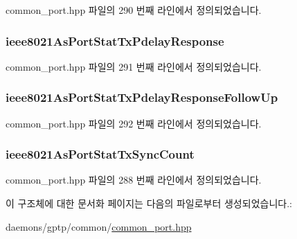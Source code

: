 common\+\_\+port.\+hpp 파일의 290 번째 라인에서 정의되었습니다.

\subsubsection[{\texorpdfstring{ieee8021\+As\+Port\+Stat\+Tx\+Pdelay\+Response}{ieee8021AsPortStatTxPdelayResponse}}]{ ieee8021\+As\+Port\+Stat\+Tx\+Pdelay\+Response}\hypertarget{struct_port_counters__t_a699064a3507a0d009de15645ca876d23}{}\label{struct_port_counters__t_a699064a3507a0d009de15645ca876d23}


common\+\_\+port.\+hpp 파일의 291 번째 라인에서 정의되었습니다.

\subsubsection[{\texorpdfstring{ieee8021\+As\+Port\+Stat\+Tx\+Pdelay\+Response\+Follow\+Up}{ieee8021AsPortStatTxPdelayResponseFollowUp}}]{ ieee8021\+As\+Port\+Stat\+Tx\+Pdelay\+Response\+Follow\+Up}\hypertarget{struct_port_counters__t_a6301a36e0490db4e2d6d7a6953c7c9f7}{}\label{struct_port_counters__t_a6301a36e0490db4e2d6d7a6953c7c9f7}


common\+\_\+port.\+hpp 파일의 292 번째 라인에서 정의되었습니다.

\subsubsection[{\texorpdfstring{ieee8021\+As\+Port\+Stat\+Tx\+Sync\+Count}{ieee8021AsPortStatTxSyncCount}}]{ ieee8021\+As\+Port\+Stat\+Tx\+Sync\+Count}\hypertarget{struct_port_counters__t_abaebe28dd0ed5e666715ddf3eb82058c}{}\label{struct_port_counters__t_abaebe28dd0ed5e666715ddf3eb82058c}


common\+\_\+port.\+hpp 파일의 288 번째 라인에서 정의되었습니다.



이 구조체에 대한 문서화 페이지는 다음의 파일로부터 생성되었습니다.\+:\begin{DoxyCompactItemize}
\item 
daemons/gptp/common/\hyperlink{common__port_8hpp}{common\+\_\+port.\+hpp}\end{DoxyCompactItemize}
